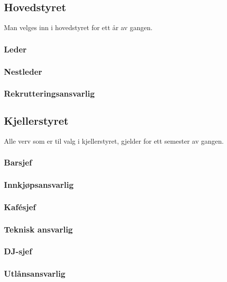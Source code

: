 \documentclass[10pt,norsk,a4paper]{article}
\begin{document}
\begin{minipage}[t]{9cm}
\subsection{Hovedstyret}
Man velges inn i hovedstyret for ett år av gangen.
\subsubsection{Leder}

\subsubsection{Nestleder}

\subsubsection{Rekrutteringsansvarlig}

\end{minipage}
\begin{minipage}[t]{9cm}
\subsection{Kjellerstyret}
Alle verv som er til valg i kjellerstyret, gjelder for ett semester av gangen.

\subsubsection{Barsjef}

\subsubsection{Innkjøpsansvarlig}

\subsubsection{Kafésjef}

\subsubsection{Teknisk ansvarlig}

\subsubsection{DJ-sjef}

\subsubsection{Utlånsansvarlig}

\end{minipage}
\end{document}
